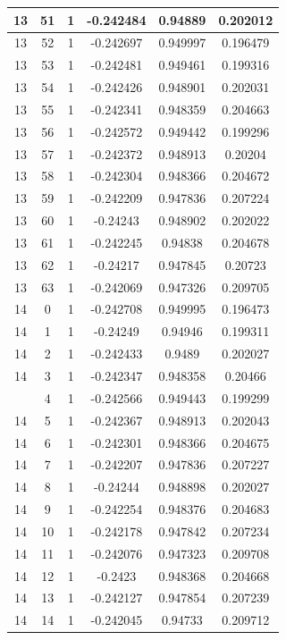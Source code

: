 \documentclass[12pt,a4paper]{article}
\numberwithin{equation}{section}
\numberwithin{figure}{section}
\numberwithin{table}{section}
\begin{document}
\begin{longtable}{|c|c|c|c|c|c|}
13 & 51 & 1 & -0.242484 & 0.94889 & 0.202012 \\ \hline
13 & 52 & 1 & -0.242697 & 0.949997 & 0.196479 \\ \hline
13 & 53 & 1 & -0.242481 & 0.949461 & 0.199316 \\ \hline
13 & 54 & 1 & -0.242426 & 0.948901 & 0.202031 \\ \hline
13 & 55 & 1 & -0.242341 & 0.948359 & 0.204663 \\ \hline
13 & 56 & 1 & -0.242572 & 0.949442 & 0.199296 \\ \hline
13 & 57 & 1 & -0.242372 & 0.948913 & 0.20204 \\ \hline
13 & 58 & 1 & -0.242304 & 0.948366 & 0.204672 \\ \hline
13 & 59 & 1 & -0.242209 & 0.947836 & 0.207224 \\ \hline
13 & 60 & 1 & -0.24243 & 0.948902 & 0.202022 \\ \hline
13 & 61 & 1 & -0.242245 & 0.94838 & 0.204678 \\ \hline
13 & 62 & 1 & -0.24217 & 0.947845 & 0.20723 \\ \hline
13 & 63 & 1 & -0.242069 & 0.947326 & 0.209705 \\ \hline
14 & 0 & 1 & -0.242708 & 0.949995 & 0.196473 \\ \hline
14 & 1 & 1 & -0.24249 & 0.94946 & 0.199311 \\ \hline
14 & 2 & 1 & -0.242433 & 0.9489 & 0.202027 \\ \hline
14 & 3 & 1 & -0.242347 & 0.948358 & 0.20466 \\ \hline
\pagebreak
14 & 4 & 1 & -0.242566 & 0.949443 & 0.199299 \\ \hline
14 & 5 & 1 & -0.242367 & 0.948913 & 0.202043 \\ \hline
14 & 6 & 1 & -0.242301 & 0.948366 & 0.204675 \\ \hline
14 & 7 & 1 & -0.242207 & 0.947836 & 0.207227 \\ \hline
14 & 8 & 1 & -0.24244 & 0.948898 & 0.202027 \\ \hline
14 & 9 & 1 & -0.242254 & 0.948376 & 0.204683 \\ \hline
14 & 10 & 1 & -0.242178 & 0.947842 & 0.207234 \\ \hline
14 & 11 & 1 & -0.242076 & 0.947323 & 0.209708 \\ \hline
14 & 12 & 1 & -0.2423 & 0.948368 & 0.204668 \\ \hline
14 & 13 & 1 & -0.242127 & 0.947854 & 0.207239 \\ \hline
14 & 14 & 1 & -0.242045 & 0.94733 & 0.209712 \\ \hline

\end{longtable}
\end{document}
